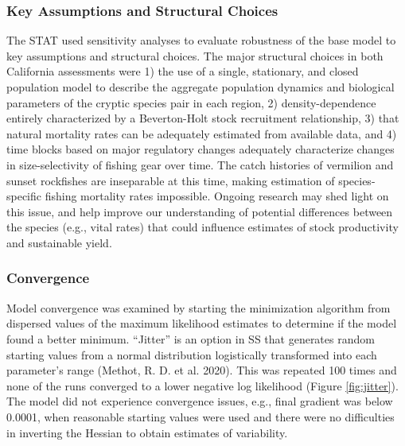 \documentclass[11pt,
  english,
  a4paper,
]{article}
\begin{document}

\hypertarget{key-assumptions-and-structural-choices}{%
\subsubsection{Key Assumptions and Structural Choices}\label{key-assumptions-and-structural-choices}}

\leavevmode\tagmcend\tagstructend

The STAT used sensitivity analyses to evaluate robustness of the base model to key assumptions and structural choices. The major structural choices in both California assessments were 1) the use of a single, stationary, and closed population model to describe the aggregate population dynamics and biological parameters of the cryptic species pair in each region, 2) density-dependence entirely characterized by a Beverton-Holt stock recruitment relationship, 3) that natural mortality rates can be adequately estimated from available data, and 4) time blocks based on major regulatory changes adequately characterize changes in size-selectivity of fishing gear over time. The catch histories of vermilion and sunset rockfishes are inseparable at this time, making estimation of species-specific fishing mortality rates impossible. Ongoing research may shed light on this issue, and help improve our understanding of potential differences between the species (e.g., vital rates) that could influence estimates of stock productivity and sustainable yield.


\hypertarget{convergence}{%
\subsubsection{Convergence}\label{convergence}}

\leavevmode\tagmcend\tagstructend

Model convergence was examined by starting the minimization algorithm from dispersed values of the maximum likelihood estimates to determine if the model found a better minimum. ``Jitter'' is an option in SS that generates random starting values from a normal distribution logistically transformed into each parameter's range {(Methot, R. D. et al. 2020)\leavevmode\tagmcend\tagstructend}. This was repeated 100 times and none of the runs converged to a lower negative log likelihood (Figure \ref{fig:jitter}). The model did not experience convergence issues, e.g., final gradient was below 0.0001, when reasonable starting values were used and there were no difficulties in inverting the Hessian to obtain estimates of variability.
\end{document}
